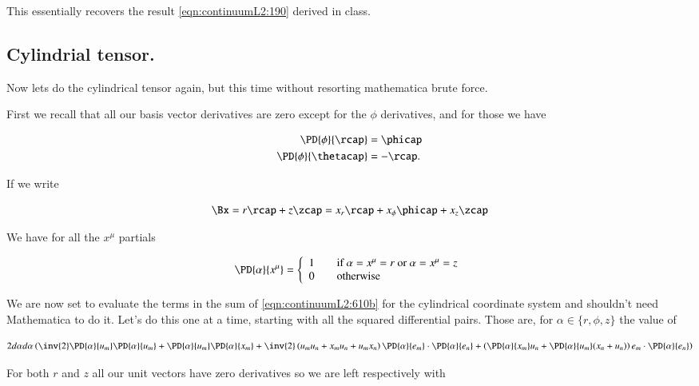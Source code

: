 This essentially recovers the result \ref{eqn:continuumL2:190} derived in class.

\subsection{Cylindrial tensor.}

Now lets do the cylindrical tensor again, but this time without resorting mathematica brute force.

First we recall that all our basis vector derivatives are zero except for the $\phi$ derivatives, and for those we have

\begin{align}\label{eqn:continuumL2:670}
\PD{\phi}{\rcap} &= \phicap \\
\PD{\phi}{\thetacap} &= -\rcap.
\end{align}

If we write

\begin{equation}\label{eqn:continuumL2:690}
\Bx = r \rcap + z \zcap = x_r \rcap + x_\phi \phicap + x_z \zcap
\end{equation}

We have for all the $x^\mu$ partials

\begin{equation}\label{eqn:continuumL2:710}
\PD{\alpha}{x^\mu} = 
\left\{
\begin{array}{l l}
1 & \quad \mbox{if $\alpha = x^\mu = r$ or $\alpha = x^\mu = z$} \\
0 & \quad \mbox{otherwise}
\end{array}
\right.
\end{equation}

We are now set to evaluate the terms in the sum of \ref{eqn:continuumL2:610b} for the cylindrical coordinate system and shouldn't need Mathematica to do it.  Let's do this one at a time, starting with all the squared differential pairs.  Those are, for $\alpha \in \{r, \phi, z\}$ the value of

\begin{equation}\label{eqn:continuumL2:n}
2 d\alpha d\alpha 
\left( 
\inv{2}
\PD{\alpha}{u_m} 
\PD{\alpha}{u_m} 
+
\PD{\alpha}{u_m} 
\PD{\alpha}{x_m} 
+ 
\inv{2}
\left(
u_m u_n 
+
x_m u_n 
+
u_m x_n 
\right)
\PD{\alpha}{e_m}
\cdot
\PD{\alpha}{e_n} 
+
\left(
\PD{\alpha}{x_m}
u_n
+
\PD{\alpha}{u_m}(
x_n
+
u_n
)
\right)
e_m \cdot 
\PD{\alpha}{e_n}
\right)
\end{equation}

For both $r$ and $z$ all our unit vectors have zero derivatives so we are left respectively with

